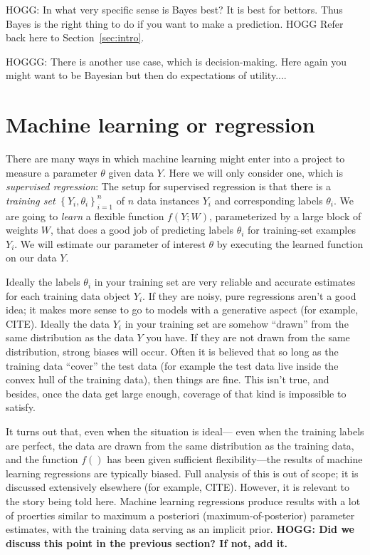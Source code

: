 \documentclass{article}
\newcommand{\sectionname}{Section}
\newcommand{\secref}[1]{\sectionname~\ref{#1}}
\newcommand{\setof}[1]{\left\{{#1}\right\}}
\begin{document}
HOGG: In what very specific sense is Bayes best?
It is best for bettors.
Thus Bayes is the right thing to do if you want to make a prediction.
HOGG Refer back here to \secref{sec:intro}.

HOGGG: There is another use case, which is decision-making.
Here again you might want to be Bayesian but then do expectations of utility....

\section{Machine learning or regression}\label{sec:ml}
There are many ways in which machine learning might enter into a project to measure a parameter $\theta$ given data $Y$.
Here we will only consider one, which is \emph{supervised regression}:
The setup for supervised regression is that there is a \emph{training set} $\setof{Y_i, \theta_i}_{i=1}^n$ of $n$ data instances $Y_i$ and corresponding labels $\theta_i$.
We are going to \emph{learn} a flexible function $f(Y;W)$, parameterized by a large block of weights $W$, that does a good job of predicting labels $\theta_i$ for training-set examples $Y_i$.
We will estimate our parameter of interest $\theta$ by executing the learned function on our data $Y$.

Ideally the labels $\theta_i$ in your training set are very reliable and accurate estimates for each training data object $Y_i$.
If they are noisy, pure regressions aren't a good idea; it makes more sense to go to models with a generative aspect (for example, CITE).
Ideally the data $Y_i$ in your training set are somehow ``drawn'' from the same distribution as the data $Y$ you have.
If they are not drawn from the same distribution, strong biases will occur.
Often it is believed that so long as the training data ``cover'' the test data (for example the test data live inside the convex hull of the training data), then things are fine.
This isn't true, and besides, once the data get large enough, coverage of that kind is impossible to satisfy.

It turns out that, even when the situation is ideal---%
even when the training labels are perfect, the data are drawn from the same distribution as the training data, and the function $f()$ has been given sufficient flexibility---the results of machine learning regressions are typically biased.
Full analysis of this is out of scope; it is discussed extensively elsewhere (for example, CITE).
However, it is relevant to the story being told here.
Machine learning regressions produce results with a lot of proerties similar to maximum a posteriori (maximum-of-posterior) parameter estimates, with the training data serving as an implicit prior.
\textbf{HOGG: Did we discuss this point in the previous section? If not, add it.}
\end{document}
